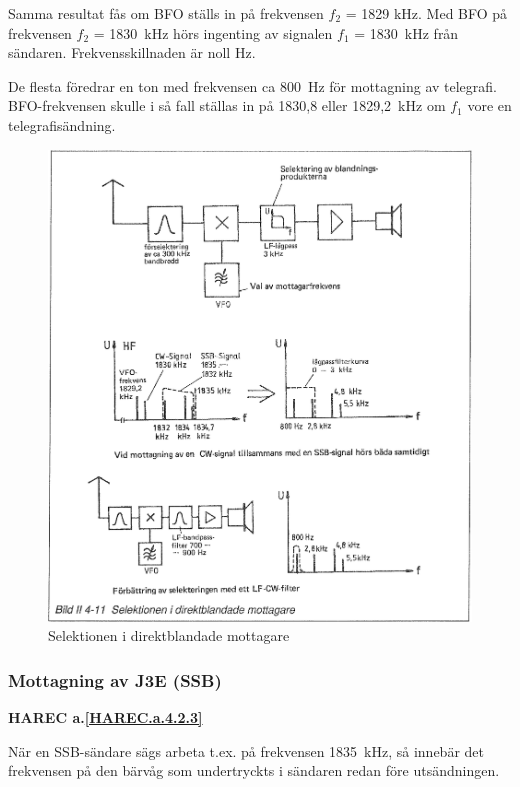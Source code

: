 Samma resultat fås om BFO ställs in på frekvensen \(f_2\) = 1829
kHz. Med BFO på frekvensen \(f_2\) = 1830~kHz hörs ingenting av
signalen \(f_1\) = 1830~kHz från sändaren.  Frekvensskillnaden är noll
Hz.

De flesta föredrar en ton med frekvensen ca 800~Hz för mottagning av
telegrafi. BFO-frekvensen skulle i så fall ställas in på 1830,8 eller
1829,2~kHz om \(f_1\) vore en telegrafisändning.

\begin{figure}
  \includegraphics[width=\textwidth]{images/bild_2_4-11}
  \caption{Selektionen i direktblandade mottagare}
  \label{fig:bildII4-11}
\end{figure}

\subsubsection{Mottagning av J3E (SSB)}
\textbf{HAREC a.\ref{HAREC.a.4.2.3}\label{myHAREC.a.4.2.3}}

När en SSB-sändare sägs arbeta t.ex. på frekvensen 1835~kHz, så
innebär det frekvensen på den bärvåg som undertryckts i sändaren redan
före utsändningen.

